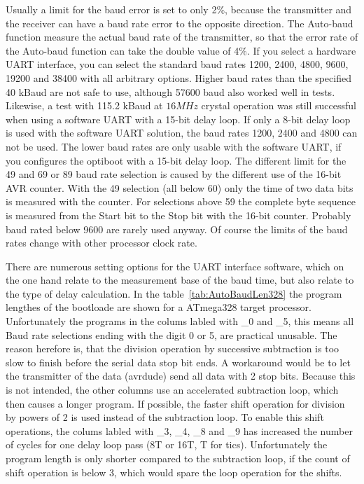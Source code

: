 Usually a limit for the baud error is set to only 2\%, because the transmitter and
the receiver can have a baud rate error to the opposite direction.
The Auto-baud function measure the actual baud rate of the transmitter,
so that the error rate of the Auto-baud function can take the double value of 4\%.
If you select a hardware UART interface, you can select the standard
baud rates 1200, 2400, 4800, 9600, 19200 and 38400 with all arbitrary options.
Higher baud rates than the specified 40 kBaud are not safe to use,
although 57600 baud also worked well in tests.
Likewise, a test with 115.2 kBaud at \(16MHz\) crystal operation was still successful
when using a software UART with a 15-bit delay loop.
If only a 8-bit delay loop is used with the software UART solution,
the baud rates 1200, 2400 and 4800 can not be used.
The lower baud rates are only usable with the software UART, if you configures
the optiboot with a 15-bit delay loop.
The different limit for the 49 and 69 or 89 baud rate selection is caused
by the different use of the 16-bit AVR counter.
With the 49 selection (all below 60) only the time of two data bits is measured
with the counter. For selections above 59 the complete byte sequence is
measured from the Start bit to the Stop bit with the 16-bit counter.
Probably baud rated below 9600 are rarely used anyway.
Of course the limits of the baud rates change with other processor clock rate.

There are numerous setting options for the UART interface software, which on the
one hand relate to the measurement base of the baud time, but also relate to the type
of delay calculation.
In the table~\ref{tab:AutoBaudLen328} the program lengthes of the bootloade are shown
for a ATmega328 target processor.
Unfortunately the programs in the colums labled with \_0 and \_5, this means all
Baud rate selections ending with the digit 0 or 5, are practical unusable.
The reason herefore is, that the division operation by successive subtraction
is too slow to finish before the serial data stop bit ends.
A workaround would be to let the transmitter of the data (avrdude) send all data with 2 stop bits.
Because this is not intended, the other columns use an accelerated subtraction loop,
which then causes a longer program.
If possible, the faster shift operation for division by powers of 2 is used instead of the subtraction loop.
To enable this shift operations, the colums labled with \_3, \_4, \_8 and \_9 
has increased the number of cycles for one delay loop pass (8T or 16T, T for tics).
Unfortunately the program length is only shorter compared to the subtraction loop,
if the count of shift operation is below 3, which would spare the loop operation for the shifts.

